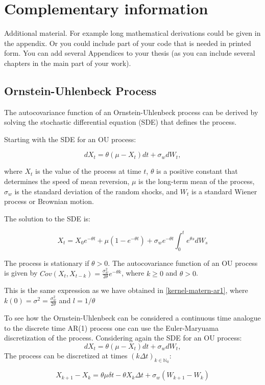 \chapter{Complementary information}\label{app:complement}


Additional material. For example long mathematical derivations could be
given in the appendix. Or you could include part of your code that is
needed in printed form. You can add several Appendices to your thesis (as
you can include several chapters in the main part of your work).

\section{Ornstein-Uhlenbeck Process}\label{app:ou}

The autocovariance function of an Ornstein-Uhlenbeck process can be derived by solving the stochastic differential equation (SDE) that defines the process.

Starting with the SDE for an OU process:

$$dX_t = \theta (\mu - X_t)dt + \sigma_w dW_t,$$

where $X_t$ is the value of the process at time $t$, $\theta$ is a positive constant that determines the speed of mean reversion,
$\mu$ is the long-term mean of the process, $\sigma_w$ is the standard deviation of the random shocks, and $W_t$ is a standard Wiener process or Brownian motion.

The solution to the SDE is:

$$ X_t = X_0 e^{-\theta t} + \mu (1-e^{-\theta t}) +
\sigma_w e^{-\theta t} \int_{0}^{t} e^{\theta s} dW_s$$

The process is stationary if $\theta > 0$.
The autocovariance function of an OU process is given by
$Cov(X_t, X_{t-k}) = \frac{\sigma_w^2}{2\theta} e^{-\theta k}$,
where $k\geq 0$ and $\theta > 0$.

This is the same expression as we have obtained in \ref{kernel-matern-ar1}, where
$k(0) = \sigma^2 = \frac{\sigma_w^2}{2\theta}$ and $l=1/\theta$

To see how the Ornstein-Uhlenbeck can be considered a continuous time analogue to the discrete time
AR(1) process one can use the Euler-Maryuama discretization of the process.
Considering again the SDE for an OU process:
$$dX_t = \theta (\mu - X_t)dt + \sigma_w dW_t,$$
The process can be discretized at times $(k \Delta t)_{k \in \mathbb{N}_0}$:

$$ X_{k+1} - X_k = \theta \mu \delta t - \theta X_k \Delta t + \sigma_w (W_{k+1} - W_k)$$

